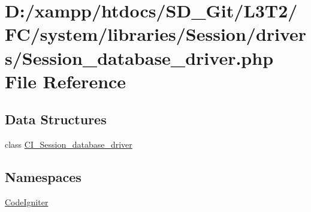 \hypertarget{system_2libraries_2_session_2drivers_2_session__database__driver_8php}{}\section{D\+:/xampp/htdocs/\+S\+D\+\_\+\+Git/\+L3\+T2/\+F\+C/system/libraries/\+Session/drivers/\+Session\+\_\+database\+\_\+driver.php File Reference}
\label{system_2libraries_2_session_2drivers_2_session__database__driver_8php}
\subsection*{Data Structures}
\begin{DoxyCompactItemize}
\item 
class \hyperlink{class_c_i___session__database__driver}{C\+I\+\_\+\+Session\+\_\+database\+\_\+driver}
\end{DoxyCompactItemize}
\subsection*{Namespaces}
\begin{DoxyCompactItemize}
\item 
 \hyperlink{namespace_code_igniter}{Code\+Igniter}
\end{DoxyCompactItemize}
